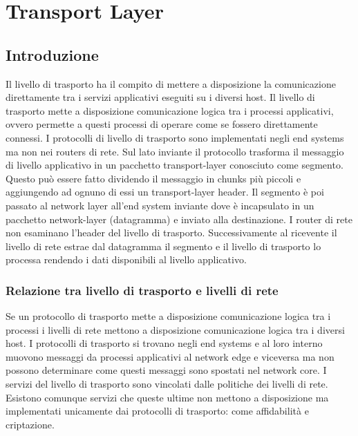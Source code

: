 \chapter{Transport Layer}
\section{Introduzione}
Il livello di trasporto ha il compito di mettere a disposizione la comunicazione direttamente tra i servizi applicativi eseguiti su i diversi host. Il 
livello di trasporto mette a disposizione comunicazione logica tra i processi applicativi, ovvero permette a questi processi di operare come se fossero 
direttamente connessi. I protocolli di livello di trasporto sono implementati negli end systems ma non nei routers di rete. Sul lato inviante il protocollo
trasforma il messaggio di livello applicativo in un pacchetto transport-layer conosciuto come segmento. Questo pu\`o essere fatto dividendo il messaggio in 
chunks pi\`u piccoli e aggiungendo ad ognuno di essi un transport-layer header. Il segmento \`e poi passato al network layer all'end system inviante dove
\`e incapsulato in un pacchetto network-layer (datagramma) e inviato alla destinazione. I router di rete non esaminano l'header del livello di trasporto.
Successivamente al ricevente il livello di rete estrae dal datagramma il segmento e il livello di trasporto lo processa rendendo i dati disponibili al
livello applicativo. 
\subsection{Relazione tra livello di trasporto e livelli di rete}
Se un protocollo di trasporto mette a disposizione comunicazione logica tra i processi i livelli di rete mettono a disposizione comunicazione logica tra i
diversi host. I protocolli di trasporto si trovano negli end systems e al loro interno muovono messaggi da processi applicativi al network edge e viceversa
ma non possono determinare come questi messaggi sono spostati nel network core. I servizi del livello di trasporto sono vincolati dalle politiche dei 
livelli di rete. Esistono comunque servizi che queste ultime non mettono a disposizione ma implementati unicamente dai protocolli di trasporto: come 
affidabilit\`a e criptazione. 
